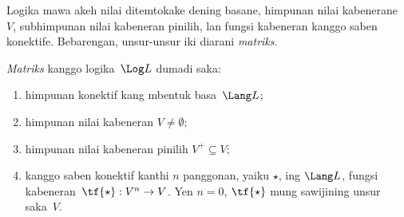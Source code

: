 \documentclass[../../../include/open-logic-section]{subfiles}
\begin{document}


Logika mawa akeh nilai ditemtokake dening basane, himpunan nilai
kabenerane~$V$, subhimpunan nilai kabeneran pinilih, lan fungsi
kabeneran kanggo saben konektife. Bebarengan, unsur-unsur iki
diarani \emph{matriks}.

\begin{defn}[Matriks]
\emph{Matriks} kanggo logika~$\Log L$ dumadi saka:
\begin{enumerate}
\item himpunan konektif kang mbentuk basa~$\Lang L$;
\item himpunan nilai kabeneran $V \neq \emptyset$;
\item himpunan nilai kabeneran pinilih $V^+ \subseteq V$;
\item kanggo saben konektif kanthi $n$ panggonan, yaiku $\star$, ing
$\Lang L$, fungsi kabeneran~$\tf{\star} : V^n \to V$.
Yen $n = 0$, $\tf{\star}$ mung sawijining unsur saka~$V$.
\end{enumerate}
\end{defn}
\end{document}
